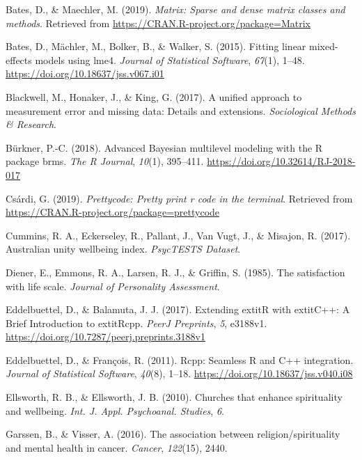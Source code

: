 \documentclass[
  english,
  man,floatsintext]{apa6}
\begin{document}
\leavevmode\hypertarget{ref-R-Matrix}{}%
Bates, D., \& Maechler, M. (2019). \emph{Matrix: Sparse and dense matrix classes and methods}. Retrieved from \url{https://CRAN.R-project.org/package=Matrix}

\leavevmode\hypertarget{ref-R-lme4}{}%
Bates, D., Mächler, M., Bolker, B., \& Walker, S. (2015). Fitting linear mixed-effects models using lme4. \emph{Journal of Statistical Software}, \emph{67}(1), 1--48. \url{https://doi.org/10.18637/jss.v067.i01}

\leavevmode\hypertarget{ref-Blackwell2017-oq}{}%
Blackwell, M., Honaker, J., \& King, G. (2017). A unified approach to measurement error and missing data: Details and extensions. \emph{Sociological Methods \& Research}.

\leavevmode\hypertarget{ref-BRMSpackage}{}%
Bürkner, P.-C. (2018). Advanced Bayesian multilevel modeling with the R package brms. \emph{The R Journal}, \emph{10}(1), 395--411. \url{https://doi.org/10.32614/RJ-2018-017}

\leavevmode\hypertarget{ref-R-prettycode}{}%
Csárdi, G. (2019). \emph{Prettycode: Pretty print r code in the terminal}. Retrieved from \url{https://CRAN.R-project.org/package=prettycode}

\leavevmode\hypertarget{ref-Cummins2017-ur}{}%
Cummins, R. A., Eckerseley, R., Pallant, J., Van Vugt, J., \& Misajon, R. (2017). Australian unity wellbeing index. \emph{PsycTESTS Dataset}.

\leavevmode\hypertarget{ref-Diener1985-xy}{}%
Diener, E., Emmons, R. A., Larsen, R. J., \& Griffin, S. (1985). The satisfaction with life scale. \emph{Journal of Personality Assessment}.

\leavevmode\hypertarget{ref-R-Rcpp_b}{}%
Eddelbuettel, D., \& Balamuta, J. J. (2017). Extending extitR with extitC++: A Brief Introduction to extitRcpp. \emph{PeerJ Preprints}, \emph{5}, e3188v1. \url{https://doi.org/10.7287/peerj.preprints.3188v1}

\leavevmode\hypertarget{ref-R-Rcpp_a}{}%
Eddelbuettel, D., \& François, R. (2011). Rcpp: Seamless R and C++ integration. \emph{Journal of Statistical Software}, \emph{40}(8), 1--18. \url{https://doi.org/10.18637/jss.v040.i08}

\leavevmode\hypertarget{ref-Ellsworth2010-yu}{}%
Ellsworth, R. B., \& Ellsworth, J. B. (2010). Churches that enhance spirituality and wellbeing. \emph{Int. J. Appl. Psychoanal. Studies}, \emph{6}.

\leavevmode\hypertarget{ref-Garssen2016-km}{}%
Garssen, B., \& Visser, A. (2016). The association between religion/spirituality and mental health in cancer. \emph{Cancer}, \emph{122}(15), 2440.
\end{document}
